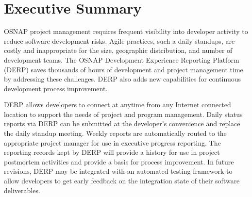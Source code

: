 \chapter*{Executive Summary}
OSNAP project management requires frequent visibility into developer activity to reduce software development risks. Agile practices, such a daily standups, are costly and inappropriate for the size, geographic distribution, and number of development teams. The OSNAP Development Experience Reporting Platform (DERP) saves thousands of hours of development and project management time by addressing these challenges. DERP also adds new capabilities for continuous development process improvement.

DERP allows developers to connect at anytime from any Internet connected location to support the needs of project and program management. Daily status reports via DERP can be submitted at the developer's convenience and replace the daily standup meeting. Weekly reports are automatically routed to the appropriate project manager for use in executive progress reporting. The reporting records kept by DERP will provide a history for use in project postmortem activities and provide a basis for process improvement. In future revisions, DERP may be integrated with an automated testing framework to allow developers to get early feedback on the integration state of their software deliverables.